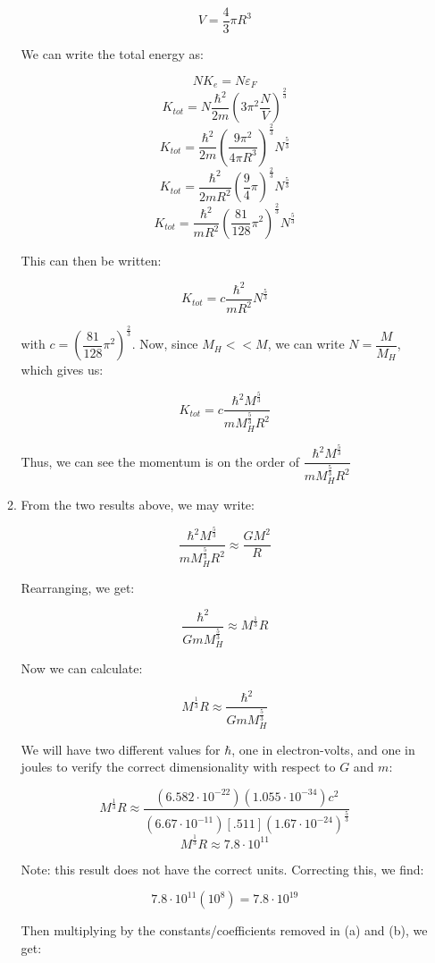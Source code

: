 \begin{enumerate}
\begin{enumerate}
        $$V=\frac{4}{3}\pi R^3$$

        We can write the total energy as:

        $$NK_e=N\varepsilon_F$$
        $$K_{tot}=N\frac{\hbar^2}{2m}\left(3\pi^2\frac{N}{V}\right)^{\frac{2}{3}}$$
        $$K_{tot}=\frac{\hbar^2}{2m}\left(\frac{9\pi^2}{4\pi R^3}\right)^{\frac{2}{3}}N^{\frac{5}{3}}$$
        $$K_{tot}=\frac{\hbar^2}{2mR^2}\left(\frac{9}{4}\pi\right)^{\frac{2}{3}}N^{\frac{5}{3}}$$
        $$K_{tot}=\frac{\hbar^2}{mR^2}\left(\frac{81}{128}\pi^2\right)^{\frac{2}{3}}N^{\frac{5}{3}}$$

        This can then be written:

        $$K_{tot}=c\frac{\hbar^2}{mR^2}N^{\frac{5}{3}}$$

        with $c=\left(\dfrac{81}{128}\pi^2\right)^{\frac{2}{3}}$. Now, since $M_H<<M$, we can write $N=\dfrac{M}{M_H}$, which gives us:

        $$\boxed{K_{tot}=c\frac{\hbar^2M^{\frac{5}{3}}}{mM_H^{\frac{5}{3}}R^2}}$$

        Thus, we can see the momentum is on the order of  $\dfrac{\hbar^2M^{\frac{5}{3}}}{mM_H^{\frac{5}{3}}R^2}$

      \item 

        From the two results above, we may write:

        $$\frac{\hbar^2M^{\frac{5}{3}}}{mM_H^{\frac{5}{3}}R^2}\approx\frac{GM^2}{R}$$

        Rearranging, we get:

        $$\frac{\hbar^2}{GmM_H^{\frac{5}{3}}}\approx M^{\frac{1}{3}}R$$

        Now we can calculate:

        $$M^{\frac{1}{3}}R\approx\frac{\hbar^2}{GmM_H^{\frac{5}{3}}}$$

        We will have two different values for $\hbar$, one in electron-volts, and one in joules to verify the correct dimensionality with respect to $G$ and $m$:

        $$M^{\frac{1}{3}}R\approx\frac{(6.582\cdot10^{-22})(1.055\cdot10^{-34})c^2}{(6.67\cdot10^{-11})[.511](1.67\cdot10^{-24})^{\frac{5}{3}}}$$
        $$M^{\frac{1}{3}}R\approx 7.8\cdot10^{11}$$

        Note: this result does not have the correct units. Correcting this, we find:

        $$7.8\cdot10^{11}(10^8)=7.8\cdot10^{19}$$

        Then multiplying by the constants/coefficients removed in (a) and (b), we get:


\end{enumerate}
\end{enumerate}
